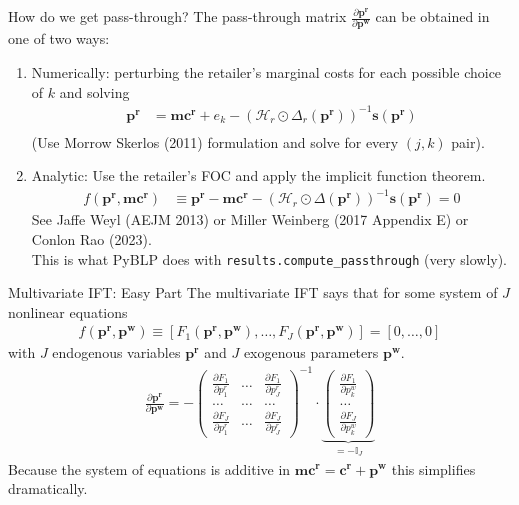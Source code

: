 \begin{frame}{How do we get pass-through?}
The \alert{pass-through matrix} $\frac{\partial \symbf{p^r}}{\partial \symbf{p^w}}$ can be obtained in one of two ways:
\begin{enumerate}
\item Numerically: perturbing the retailer's marginal costs for each possible choice of $k$ and solving
\begin{align*}
\symbf{p^r} &=\symbf{mc^r} + e_k -(\mathcal{H}_r \odot \Delta_{r}(\symbf{p^r}))^{-1} \symbf{s}(\symbf{p^r})\\
\end{align*}
(Use Morrow Skerlos (2011) formulation and solve for every $(j,k)$ pair).
\item Analytic: Use the retailer's FOC and apply the implicit function theorem.
\begin{align}
\tag{retailer FOC}
 f(\symbf{p^r},\symbf{mc^r}) &\equiv \symbf{p^r}  - \symbf{mc^r}-  \left(\mathcal{H}_{r} \odot \Delta(\symbf{p^r}) \right)^{-1} \symbf{s}(\symbf{p^r})=0 
\end{align}
See Jaffe Weyl (AEJM 2013) or Miller Weinberg (2017 Appendix E) or Conlon Rao (2023).\\
\alert{This is what PyBLP does} with \texttt{results.compute\_passthrough} (very slowly).
\end{enumerate}
\end{frame}



\begin{frame}{Multivariate IFT: Easy Part}
The multivariate IFT says that for some system of $J$ nonlinear equations 
\begin{align*}
f(\symbf{p^r},\symbf{p^w}) \equiv [F_1(\symbf{p^r},\symbf{p^w}), \ldots, F_J(\symbf{p^r},\symbf{p^w})]=[0,\ldots,0]
\end{align*}
with $J$ endogenous variables $\symbf{p^r}$ and $J$ exogenous parameters $\symbf{p^w}$.
\begin{align}
\label{eq:ptr_matrix}
\tag{PTR}
\frac{\partial \symbf{p^r}}{\partial \symbf{p^w}}
=-\left(\begin{array}{ccc}
\frac{\partial F_{1}}{\partial p_{1}^r} & \ldots & \frac{\partial F_{1}}{\partial p_{J}^r} \\
\ldots & \ldots & \ldots \\
\frac{\partial F_{J}}{\partial p_{1}^r} & \ldots & \frac{\partial F_{J}}{\partial p_{J}^r}
\end{array}\right)^{-1} \cdot \underbrace{\left(\begin{array}{l}
\frac{\partial F_{1}}{\partial p_{k}^w} \\
\ldots \\
\frac{\partial F_{J}}{\partial p_{k}^w}
\end{array}\right)}_{= -\mathbb{I}_J}
\end{align}
Because the system of equations is additive in $\symbf{mc^r} = \symbf{c^r} + \symbf{p^w}$ this simplifies dramatically.
\end{frame}


